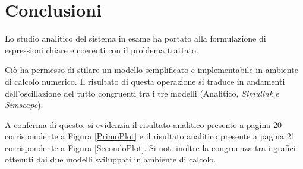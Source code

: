 \section{Conclusioni}
Lo studio analitico del sistema in esame ha portato alla formulazione di espressioni chiare e coerenti con il problema trattato.

Ciò ha permesso di stilare un modello semplificato e implementabile in ambiente di calcolo numerico. Il risultato di questa operazione si traduce in andamenti dell'oscillazione del tutto congruenti tra i tre modelli (Analitico, \textit{Simulink} e \textit{Simscape}).

A conferma di questo, si evidenzia il risultato analitico presente a pagina 20 corrispondente a Figura \ref{PrimoPlot} e il risultato analitico presente a pagina 21 corrispondente a Figura \ref{SecondoPlot}. Si noti inoltre la congruenza tra i grafici ottenuti dai due modelli sviluppati in ambiente di calcolo. 